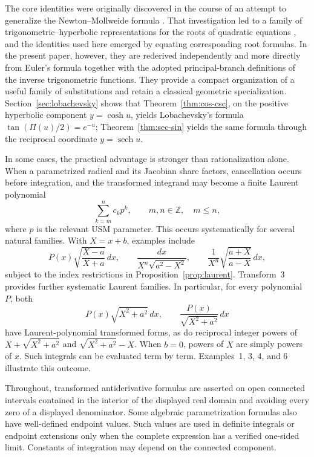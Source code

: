 \documentclass[11pt]{article}
\theoremstyle{remark}
\DeclareMathOperator{\sech}{sech}
\begin{document}
The core identities were originally discovered in the course of an attempt to generalize the Newton--Mollweide formula \cite{GarciaMollweide}. That investigation led to a family of trigonometric--hyperbolic representations for the roots of quadratic equations \cite{GarciaRoots}, and the identities used here emerged by equating corresponding root formulas. In the present paper, however, they are rederived independently and more directly from Euler's formula together with the adopted principal-branch definitions of the inverse trigonometric functions. They provide a compact organization of a useful family of substitutions and retain a classical geometric specialization. Section~\ref{sec:lobachevsky} shows that Theorem~\ref{thm:cos-csc}, on the positive hyperbolic component $y=\cosh u$, yields Lobachevsky's formula $\tan(\Pi(u)/2)=e^{-u}$; Theorem~\ref{thm:sec-sin} yields the same formula through the reciprocal coordinate $y=\sech u$.

In some cases, the practical advantage is stronger than rationalization alone. When a parametrized radical and its Jacobian share factors, cancellation occurs before integration, and the transformed integrand may become a finite Laurent polynomial
\[
\sum_{k=m}^{n}c_kp^k,
\qquad m,n\in\mathbb Z,\quad m\le n,
\]
where $p$ is the relevant USM parameter. This occurs systematically for several natural families. With $X=x+b$, examples include
\[
P(x)\sqrt{\frac{X-a}{X+a}}\,dx,
\qquad
\frac{dx}{X^n\sqrt{a^2-X^2}},
\qquad
\frac{1}{X^n}\sqrt{\frac{a+X}{a-X}}\,dx,
\]
subject to the index restrictions in Proposition~\ref{prop:laurent}. Transform~3 provides further systematic Laurent families. In particular, for every polynomial $P$, both
\[
P(x)\sqrt{X^2+a^2}\,dx,
\qquad
\frac{P(x)}{\sqrt{X^2+a^2}}\,dx
\]
have Laurent-polynomial transformed forms, as do reciprocal integer powers of $X+\sqrt{X^2+a^2}$ and $\sqrt{X^2+a^2}-X$. When $b=0$, powers of $X$ are simply powers of $x$. Such integrals can be evaluated term by term. Examples~1, 3, 4, and 6 illustrate this outcome.

Throughout, transformed antiderivative formulas are asserted on open connected intervals contained in the interior of the displayed real domain and avoiding every zero of a displayed denominator. Some algebraic parametrization formulas also have well-defined endpoint values. Such values are used in definite integrals or endpoint extensions only when the complete expression has a verified one-sided limit. Constants of integration may depend on the connected component.
\end{document}
